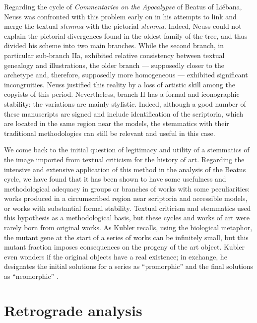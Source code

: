 \begin{paper}
Regarding the cycle of \emph{Commentaries on the Apocalypse} of Beatus
of Liébana, Neuss was confronted with this problem early on in his
attempts to link and merge the textual \emph{stemma} with the pictorial
\emph{stemma}. Indeed, Neuss could not explain the pictorial divergences
found in the oldest family of the tree, and thus divided his scheme into
two main branches. While the second branch, in particular sub-branch
IIa, exhibited relative consistency between textual genealogy and
illustrations, the older branch –– supposedly closer to the archetype
and, therefore, supposedly more homogeneous –– exhibited significant
incongruities. Neuss justified this reality by a loss of artistic skill
among the copyists of this period. Nevertheless, branch II has a formal
and iconographic stability: the variations are mainly stylistic. Indeed,
although a good number of these manuscripts are signed and include
identification of the scriptoria, which are located in the same region
near the models, the stemmatics with their traditional methodologies can
still be relevant and useful in this case.

We come back to the initial question of legitimacy and utility of a
stemmatics of the image imported from textual criticism for the history
of art. Regarding the intensive and extensive application of this method
in the analysis of the Beatus cycle, we have found that it has been
shown to have some usefulness and methodological adequacy in groups or
branches of works with some peculiarities: works produced in a
circumscribed region near scriptoria and accessible models, or works
with substantial formal stability. Textual criticism and stemmatics used
this hypothesis as a methodological basis, but these cycles and works of
art were rarely born from original works. As Kubler recalls, using the
biological metaphor, the mutant gene at the start of a series of works
can be infinitely small, but this mutant fraction imposes consequences
on the progeny of the art object. Kubler even wonders if the original
objects have a real existence; in exchange, he designates the initial
solutions for a series as ``promorphic'' and the final solutions as
``neomorphic'' \citep[40]{kubler_shape_1970}.

\section*{Retrograde analysis}


\end{paper}
